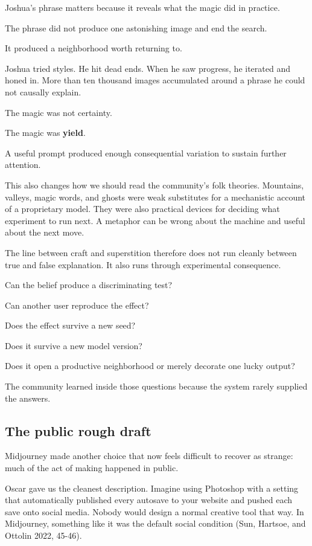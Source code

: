 \documentclass[
]{article}
\begin{document}
Joshua's phrase matters because it reveals what the magic did in
practice.

The phrase did not produce one astonishing image and end the search.

It produced a neighborhood worth returning to.

Joshua tried styles. He hit dead ends. When he saw progress, he iterated
and honed in. More than ten thousand images accumulated around a phrase
he could not causally explain.

The magic was not certainty.

The magic was \textbf{yield}.

A useful prompt produced enough consequential variation to sustain
further attention.

This also changes how we should read the community's folk theories.
Mountains, valleys, magic words, and ghosts were weak substitutes for a
mechanistic account of a proprietary model. They were also practical
devices for deciding what experiment to run next. A metaphor can be
wrong about the machine and useful about the next move.

The line between craft and superstition therefore does not run cleanly
between true and false explanation. It also runs through experimental
consequence.

Can the belief produce a discriminating test?

Can another user reproduce the effect?

Does the effect survive a new seed?

Does it survive a new model version?

Does it open a productive neighborhood or merely decorate one lucky
output?

The community learned inside those questions because the system rarely
supplied the answers.

\subsection{The public rough draft}\label{the-public-rough-draft}

Midjourney made another choice that now feels difficult to recover as
strange: much of the act of making happened in public.

Oscar gave us the cleanest description. Imagine using Photoshop with a
setting that automatically published every autosave to your website and
pushed each save onto social media. Nobody would design a normal
creative tool that way. In Midjourney, something like it was the default
social condition (Sun, Hartsoe, and Ottolin 2022, 45-46).
\end{document}
